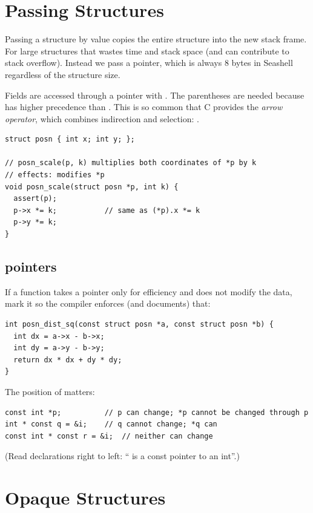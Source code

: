\section{Passing Structures}

Passing a structure by value copies the entire structure into the new stack frame. For large
structures that wastes time and stack space (and can contribute to stack overflow). Instead we
pass a pointer, which is always 8 bytes in Seashell regardless of the structure size.

Fields are accessed through a pointer with . The parentheses are needed
because  has higher precedence than \code{*}. This is so common that C provides the
\emph{arrow operator}, which combines indirection and selection: .
\begin{lstlisting}[style=c]
struct posn { int x; int y; };

// posn_scale(p, k) multiplies both coordinates of *p by k
// effects: modifies *p
void posn_scale(struct posn *p, int k) {
  assert(p);
  p->x *= k;           // same as (*p).x *= k
  p->y *= k;
}
\end{lstlisting}

\subsection{ pointers}

If a function takes a pointer only for efficiency and does not modify the data, mark it
 so the compiler enforces (and documents) that:
\begin{lstlisting}[style=c]
int posn_dist_sq(const struct posn *a, const struct posn *b) {
  int dx = a->x - b->x;
  int dy = a->y - b->y;
  return dx * dx + dy * dy;
}
\end{lstlisting}
The position of  matters:
\begin{lstlisting}[style=c]
const int *p;          // p can change; *p cannot be changed through p
int * const q = &i;    // q cannot change; *q can
const int * const r = &i;  // neither can change
\end{lstlisting}
(Read declarations right to left: `` is a const pointer to an int''.)

\section{Opaque Structures}

